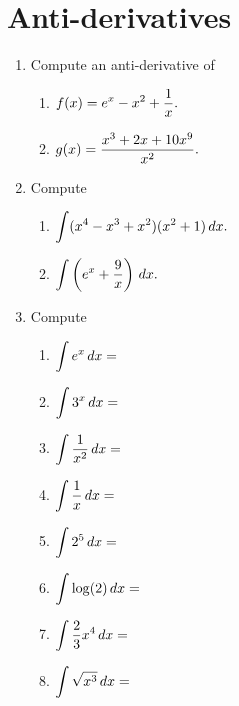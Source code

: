 \documentclass[10pt]{article}
\begin{document}
\pagestyle{otherpages}
\thispagestyle{firstpage}



\section{Anti-derivatives}
\begin{enumerate}
    \item Compute an anti-derivative of 
    \begin{enumerate}
        \item $\displaystyle f(x) = e^x - x^2 + \frac{1}{x}.$
        \item $\displaystyle g(x) = \frac{x^3+ 2x + 10x^9}{x^2}.$
    \end{enumerate}
    \item Compute 
    \begin{enumerate}
        \item $\displaystyle \int (x^4 - x^3 + x^2)(x^2 + 1)\,dx.$
        \item $\displaystyle \int \left(e^x  + \frac{9}{x}\right)\,dx.$
    \end{enumerate}    
    \item Compute
    \begin{enumerate}
        \item $\displaystyle \int e^x \,dx=$
        \item $\displaystyle \int 3^x \,dx=$ 
        \item $\displaystyle \int \frac{1}{x^2} \,dx =$ 
        \item $\displaystyle \int \frac{1}{x} \,dx =$
        \item $\displaystyle \int 2^5 \,dx =$ 
        \item $\displaystyle \int \log(2) \,dx =$ 
        \item $\displaystyle \int \frac23x^4 \,dx =$
        \item $\displaystyle \int \sqrt{x^3} \,dx =$
    \end{enumerate}


\end{enumerate}

\newpage 
\end{document}
